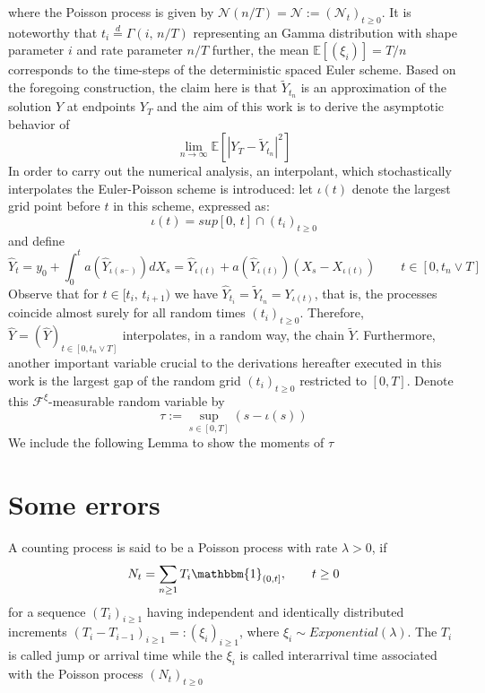 where the Poisson process is given by $\mathcal{N}(n/T) = \mathcal{N} := (\mathcal{N}_{t})_{t \geq 0}$. It is noteworthy that $t_{i} \overset{d}{=} \Gamma(i, \, n/T)$ representing an Gamma distribution with shape parameter $i$ and rate parameter $n/T$ further, the mean $\mathbb{E}[ (\xi_{i})]= T/n$ corresponds to the time-steps of the deterministic spaced Euler scheme. Based on the foregoing construction, the  claim here is that $\tilde{Y}_{t_n}$ is an approximation of the solution $Y$ at endpoints $Y_T$ and the aim of this work is to derive the asymptotic behavior of 
\begin{equation}\label{eq6}
\lim_{n\to\infty} \mathbb{E}[|Y_T - \tilde{Y}_{t_n}|^2]
\end{equation}
In order to carry out the numerical analysis, an interpolant, which stochastically interpolates the Euler-Poisson scheme is introduced: let $\iota(t)$ denote the largest grid point before $t$ in this scheme, expressed as:
\begin{equation*}
\iota(t) = sup[0, \, t] \cap (t_{i})_{t \geq 0}
\end{equation*}
and define 
\begin{equation}\label{eq7}
\hat{Y}_{t} = y_0 + \int^t_{0} a(\hat{Y}_{\iota(s^-)})dX_s = \hat{Y}_{\iota(t)} + a(\hat{Y}_{\iota(t)})(X_s - X_{\iota(t)}) \qquad t \in [0, t_n \lor T]
\end{equation}
Observe that for $t \in [t_i, \, t_{i+1})$ we have $\hat{Y}_{t_i}= \tilde{Y}_{t_n} = Y_{\iota(t)}$, that is, the processes coincide almost surely for all random times $(t_{i})_{t \geq 0}$. Therefore, $ \hat{Y} = (\hat{Y})_{t \in [0, t_n \lor T]} $ interpolates, in a random way, the chain $\tilde{Y}$. Furthermore, another important variable crucial to the derivations hereafter executed in this work is the largest gap of the random grid $(t_{i})_{t \geq 0}$ restricted to $[0, T]$. Denote this $\mathcal{F}^{\xi}$-measurable random variable by
\begin{equation}\label{eq8}
\tau := \sup_{s \in [0, T] } (s - \iota (s))
\end{equation}
We include the following Lemma to show the moments of $\tau$



\section{Some errors }
A counting process is said to be a Poisson process with rate $\lambda > 0$, if 
\begin{equation}\label{arr_Poisson}
    N_t = \sum_{n \geq 1} T_i\mathbbm{1}_{(0, t]}, \qquad t \geq 0
\end{equation}
for a sequence $(T_i)_{i \geq 1}$ having independent and identically distributed increments $(T_i - T_{i-1})_{i \geq 1} =: (\xi_i)_{i \geq 1}$, where $\xi_i \sim Exponential(\lambda)$. The $T_i$ is called jump or arrival time while the $\xi_i$ is called interarrival time associated with the Poisson process $(N_t)_{t \geq 0}$

